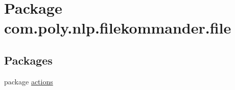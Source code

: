 \hypertarget{namespacecom_1_1poly_1_1nlp_1_1filekommander_1_1file}{\section{Package com.\-poly.\-nlp.\-filekommander.\-file}
\label{namespacecom_1_1poly_1_1nlp_1_1filekommander_1_1file}
}
\subsection*{Packages}
\begin{DoxyCompactItemize}
\item 
package \hyperlink{namespacecom_1_1poly_1_1nlp_1_1filekommander_1_1file_1_1actions}{actions}
\end{DoxyCompactItemize}
